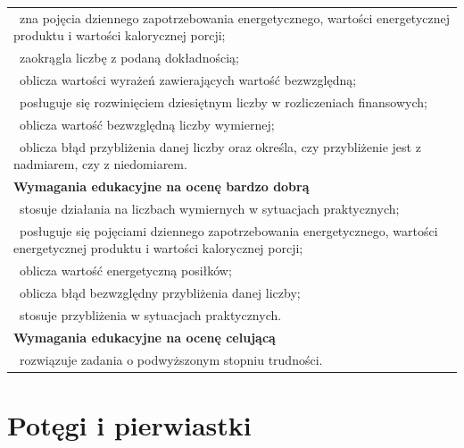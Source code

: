 \documentclass[12pt,a4paper]{article}
\begin{document}
\begin{longtable}{|p{16cm}|}
		\textbullet\ zna pojęcia dziennego zapotrzebowania energetycznego, wartości energetycznej produktu i wartości kalorycznej porcji; \\
		
		\textbullet\ zaokrągla liczbę z podaną dokładnością; \\
		
		\textbullet\ oblicza wartości wyrażeń zawierających wartość bezwzględną; \\
		
		\textbullet\ posługuje się rozwinięciem dziesiętnym liczby w rozliczeniach finansowych; \\
		
		\textbullet\ oblicza wartość bezwzględną liczby wymiernej; \\
		
		\textbullet\ oblicza błąd przybliżenia danej liczby oraz określa, czy przybliżenie jest z nadmiarem, czy z niedomiarem. \\ \hline
		
		\textbf{Wymagania edukacyjne na ocenę bardzo dobrą} \\ \hline
		
		\textbullet\ stosuje działania na liczbach wymiernych w sytuacjach praktycznych; \\
		
		\textbullet\ posługuje się pojęciami dziennego zapotrzebowania energetycznego, wartości energetycznej produktu i wartości kalorycznej porcji; \\
		
		\textbullet\ oblicza wartość energetyczną posiłków; \\
		
		\textbullet\ oblicza błąd bezwzględny przybliżenia danej liczby; \\
		
		\textbullet\ stosuje przybliżenia w sytuacjach praktycznych. \\ \hline
		
		\textbf{Wymagania edukacyjne na ocenę celującą} \\ \hline
		
		\textbullet\ rozwiązuje zadania o podwyższonym stopniu trudności. \\ \hline
		
	\end{longtable}
	
	\section{Potęgi i pierwiastki}
	
\end{document}
